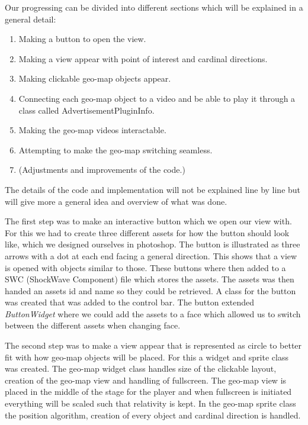 \documentclass[9pt,a4paper]{acmproc}
\begin{document}
Our progressing can be divided into different sections which will be explained in a general detail:

\begin{enumerate}
\item Making a button to open the view.

\item Making a view appear with point of interest and cardinal directions.

\item Making clickable geo-map objects appear.

\item Connecting each geo-map object to a video and be able to play it through a class called AdvertisementPluginInfo.

\item Making the geo-map videos interactable.

\item Attempting to make the geo-map switching seamless.

\item (Adjustments and improvements of the code.)
\end{enumerate}

The details of the code and implementation will not be explained line by line but will give more a general idea and overview of what was done.

The first step was to make an interactive button which we open our view with. For this we had to create three different assets for how the button should look like, which we designed ourselves in photoshop. The button is illustrated as three arrows with a dot at each end facing a general direction. This shows that a view is opened with objects similar to those. These buttons where then added to a SWC (ShockWave Component) file which stores the assets. The assets was then handed an assets id and name so they could be retrieved. A class for the button was created that was added to the control bar. The button extended \textit{ButtonWidget} where we could add the assets to a face which allowed us to switch between the different assets when changing face. 

The second step was to make a view appear that is represented as circle to better fit with how geo-map objects will be placed. For this a widget and sprite class was created. The geo-map widget class handles size of the clickable layout, creation of the geo-map view and handling of fullscreen. The geo-map view is placed in the middle of the stage for the player and when fullscreen is initiated everything will be scaled such that relativity is kept. In the geo-map sprite class the position algorithm, creation of every object and cardinal direction is handled.
\end{document}

